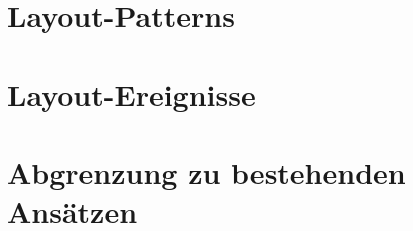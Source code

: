 \section{Layout-Patterns}




\section{Layout-Ereignisse}


\section{Abgrenzung zu bestehenden Ansätzen}

